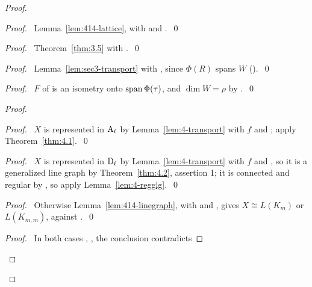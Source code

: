 \begin{proof}
 \begin{proof}\pf\ Lemma~\ref{lem:414-lattice}, with  and .~\qed\end{proof}
 \begin{proof}\pf\ Theorem~\ref{thm:3.5} with .~\qed\end{proof}
 \begin{proof}\pf\ Lemma~\ref{lem:sec3-transport} with , since $\Phi(R)$ spans
  $W$ ().~\qed\end{proof}
 \begin{proof}\pf\ $F$ of  is an isometry onto $\mathop{\mathrm{span}}\nolimits\Phi(\tau)$, and
  $\dim W=\rho$ by .~\qed\end{proof}
 \begin{proof}
  \begin{proof}\pf\ $X$ is represented in $\mathrm{A}_\ell$ by Lemma~\ref{lem:4-transport} with $f$
   and ; apply Theorem~\ref{thm:4.1}.~\qed\end{proof}
  \begin{proof}\pf\ $X$ is represented in $\mathrm{D}_\ell$ by Lemma~\ref{lem:4-transport} with $f$
   and , so it is a generalized line graph by Theorem~\ref{thm:4.2}, assertion 1;
   it is connected and regular by , so apply
   Lemma~\ref{lem:4-regglg}.~\qed\end{proof}
  \begin{proof}\pf\ Otherwise Lemma~\ref{lem:414-linegraph}, with  and
   , gives $X\cong L(K_m)$ or $L(K_{m,m})$, against .~\qed\end{proof}
  \qedstep
  \begin{proof}\pf\ In both cases , , the conclusion contradicts

\end{proof}
\end{proof}
\end{proof}
